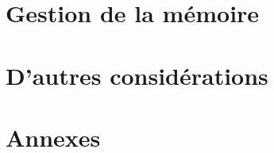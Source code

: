 \documentclass[a4paper]{book}
\begin{document}
\part{Gestion de la m\'emoire}

%
\part{D'autres consid\'erations}
%


\part{Annexes}


\lstlistoflistings

\nocite{*}


\end{document}
